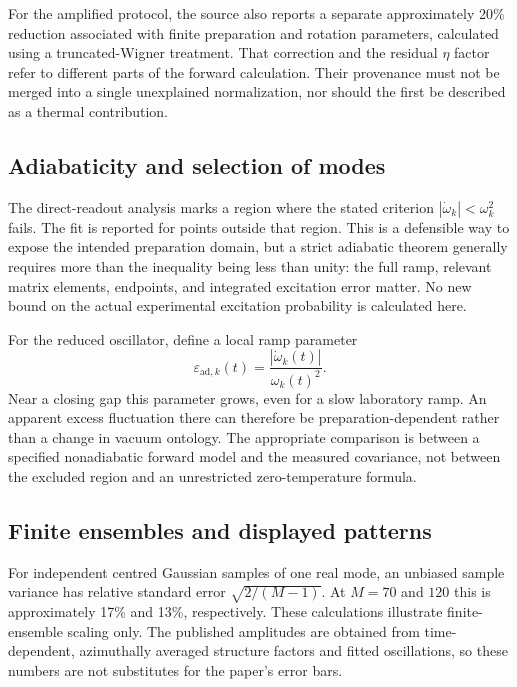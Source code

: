 \documentclass[11pt,a4paper]{article}
\theoremstyle{definition}
\theoremstyle{remark}
\begin{document}
For the amplified protocol, the source also reports a separate approximately 20\% reduction associated with finite preparation and rotation parameters, calculated using a truncated-Wigner treatment. That correction and the residual $\eta$ factor refer to different parts of the forward calculation. Their provenance must not be merged into a single unexplained normalization, nor should the first be described as a thermal contribution.\cite{zhang2026,blakie}

\subsection{Adiabaticity and selection of modes}
The direct-readout analysis marks a region where the stated criterion $|\dot\omega_k|<\omega_k^2$ fails. The fit is reported for points outside that region. This is a defensible way to expose the intended preparation domain, but a strict adiabatic theorem generally requires more than the inequality being less than unity: the full ramp, relevant matrix elements, endpoints, and integrated excitation error matter. No new bound on the actual experimental excitation probability is calculated here.\cite{zhang2026}

For the reduced oscillator, define a local ramp parameter
\begin{equation}
 \varepsilon_{\mathrm{ad},k}(t)
 =\frac{|\dot\omega_k(t)|}{\omega_k(t)^2}.
 \label{eq:adiabatic}
\end{equation}
Near a closing gap this parameter grows, even for a slow laboratory ramp. An apparent excess fluctuation there can therefore be preparation-dependent rather than a change in vacuum ontology. The appropriate comparison is between a specified nonadiabatic forward model and the measured covariance, not between the excluded region and an unrestricted zero-temperature formula.

\subsection{Finite ensembles and displayed patterns}
For independent centred Gaussian samples of one real mode, an unbiased sample variance has relative standard error $\sqrt{2/(M-1)}$. At $M=70$ and $120$ this is approximately 17\% and 13\%, respectively. These calculations illustrate finite-ensemble scaling only. The published amplitudes are obtained from time-dependent, azimuthally averaged structure factors and fitted oscillations, so these numbers are not substitutes for the paper's error bars.\cite{zhang2026}
\end{document}
